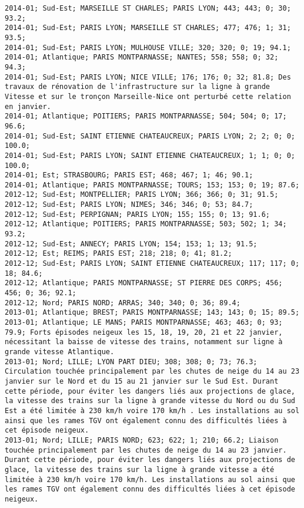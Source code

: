 \documentclass{article}
\begin{document}
\begin{Verbatim}[commandchars=\\\{\}]
2014-01; Sud-Est; MARSEILLE ST CHARLES; PARIS LYON; 443; 443; 0; 30; 93.2; 
2014-01; Sud-Est; PARIS LYON; MARSEILLE ST CHARLES; 477; 476; 1; 31; 93.5; 
2014-01; Sud-Est; PARIS LYON; MULHOUSE VILLE; 320; 320; 0; 19; 94.1; 
2014-01; Atlantique; PARIS MONTPARNASSE; NANTES; 558; 558; 0; 32; 94.3; 
2014-01; Sud-Est; PARIS LYON; NICE VILLE; 176; 176; 0; 32; 81.8; Des travaux de rénovation de l'infrastructure sur la ligne à grande Vitesse et sur le tronçon Marseille-Nice ont perturbé cette relation en janvier.
2014-01; Atlantique; POITIERS; PARIS MONTPARNASSE; 504; 504; 0; 17; 96.6; 
2014-01; Sud-Est; SAINT ETIENNE CHATEAUCREUX; PARIS LYON; 2; 2; 0; 0; 100.0; 
2014-01; Sud-Est; PARIS LYON; SAINT ETIENNE CHATEAUCREUX; 1; 1; 0; 0; 100.0; 
2014-01; Est; STRASBOURG; PARIS EST; 468; 467; 1; 46; 90.1; 
2014-01; Atlantique; PARIS MONTPARNASSE; TOURS; 153; 153; 0; 19; 87.6; 
2012-12; Sud-Est; MONTPELLIER; PARIS LYON; 366; 366; 0; 31; 91.5; 
2012-12; Sud-Est; PARIS LYON; NIMES; 346; 346; 0; 53; 84.7; 
2012-12; Sud-Est; PERPIGNAN; PARIS LYON; 155; 155; 0; 13; 91.6; 
2012-12; Atlantique; POITIERS; PARIS MONTPARNASSE; 503; 502; 1; 34; 93.2; 
2012-12; Sud-Est; ANNECY; PARIS LYON; 154; 153; 1; 13; 91.5; 
2012-12; Est; REIMS; PARIS EST; 218; 218; 0; 41; 81.2; 
2012-12; Sud-Est; PARIS LYON; SAINT ETIENNE CHATEAUCREUX; 117; 117; 0; 18; 84.6; 
2012-12; Atlantique; PARIS MONTPARNASSE; ST PIERRE DES CORPS; 456; 456; 0; 36; 92.1; 
2012-12; Nord; PARIS NORD; ARRAS; 340; 340; 0; 36; 89.4; 
2013-01; Atlantique; BREST; PARIS MONTPARNASSE; 143; 143; 0; 15; 89.5; 
2013-01; Atlantique; LE MANS; PARIS MONTPARNASSE; 463; 463; 0; 93; 79.9; Forts épisodes neigeux les 15, 18, 19, 20, 21 et 22 janvier, nécessitant la baisse de vitesse des trains, notamment sur ligne à grande vitesse Atlantique.
2013-01; Nord; LILLE; LYON PART DIEU; 308; 308; 0; 73; 76.3; Circulation touchée principalement par les chutes de neige du 14 au 23 janvier sur le Nord et du 15 au 21 janvier sur le Sud Est. Durant cette période, pour éviter les dangers liés aux projections de glace, la vitesse des trains sur la ligne à grande vitesse du Nord ou du Sud Est a été limitée à 230 km/h voire 170 km/h . Les installations au sol ainsi que les rames TGV ont également connu des difficultés liées à cet épisode neigeux.
2013-01; Nord; LILLE; PARIS NORD; 623; 622; 1; 210; 66.2; Liaison touchée principalement par les chutes de neige du 14 au 23 janvier. Durant cette période, pour éviter les dangers liés aux projections de glace, la vitesse des trains sur la ligne à grande vitesse a été limitée à 230 km/h voire 170 km/h. Les installations au sol ainsi que les rames TGV ont également connu des difficultés liées à cet épisode neigeux.

\end{Verbatim}
\end{document}
